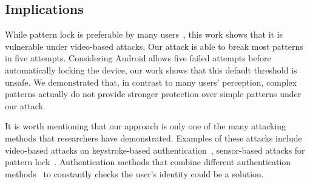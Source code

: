 

\subsection{Implications}
While pattern lock is preferable by many users~\cite{androidstudy}, this     work shows
that it is vulnerable under video-based attacks. Our attack
is able to break most patterns in five attempts. Considering Android
allows five failed attempts before automatically locking the device, our work
shows that this default threshold is unsafe. We demonstrated that, in contrast to many users'
perception, complex patterns actually do not provide stronger protection over simple patterns under our attack.

It is worth mentioning that our approach is only one of the many attacking
methods that researchers have demonstrated. Examples of these attacks include
video-based attacks on keystroke-based authentication~\cite{shukla2014beware,yue2014blind}, sensor-based attacks for
pattern lock~\cite{zhang2016privacy}. Authentication methods that combine different
authentication methods~\cite{de2012touch,stefan2012robustness,lingsecure,mannan2007using} to constantly checks the user's identity could be
a solution. %



